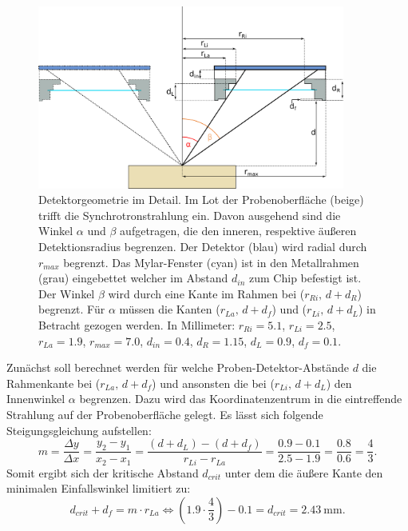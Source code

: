 \begin{figure}[H]
  \centering
     \includegraphics[width=0.9\textwidth]{illustrations/winkel.png}
  \caption[Detektorgeometrie im Detail]{Detektorgeometrie im Detail. Im Lot der Probenoberfläche (beige) trifft die Synchrotronstrahlung ein. Davon ausgehend sind die Winkel $\alpha$ und $\beta$ aufgetragen, die den inneren, respektive äußeren Detektionsradius begrenzen. Der Detektor (blau) wird radial durch $r_{max}$ begrenzt. Das Mylar-Fenster (cyan) ist in den Metallrahmen (grau) eingebettet welcher im Abstand $d_{in}$ zum Chip befestigt ist. Der Winkel $\beta$ wird durch eine Kante im Rahmen bei ($r_{Ri},\,d+d_{R}$) begrenzt. Für $\alpha$ müssen die Kanten ($r_{La},\,d+d_{f}$) und ($r_{Li},\,d+d_{L}$) in Betracht gezogen werden. In Millimeter: $r_{Ri}=5.1$, $r_{Li}=2.5$, $r_{La}=1.9$, $r_{max}=7.0$, $d_{in}=0.4$, $d_{R}=1.15$, $d_{L}=0.9$, $d_{f}=0.1$.}
  \label{fig:quaddetektor}
\end{figure}
Zunächst soll berechnet werden für welche Proben-Detektor-Abstände $d$ die Rahmenkante bei ($r_{La},\,d+d_{f}$) und ansonsten die bei ($r_{Li},\,d+d_{L}$) den Innenwinkel $\alpha$ begrenzen. Dazu wird das Koordinatenzentrum in die eintreffende Strahlung auf der Probenoberfläche gelegt. Es lässt sich folgende Steigungsgleichung aufstellen:
\begin{equation}
m = \frac{\Delta y}{\Delta x} = \frac{y_2-y_1}{x_2-x_1} = \frac{(d+d_{L})-(d+d_{f})}{r_{Li}-r_{La}} = \frac{0.9-0.1}{2.5-1.9} = \frac{0.8}{0.6} = \frac{4}{3} .
\end{equation}
Somit ergibt sich der kritische Abstand $d_{crit}$ unter dem die äußere Kante den minimalen Einfallswinkel limitiert zu:
\begin{equation}
d_{crit} + d_f = m \cdot r_{La} \Leftrightarrow (1.9 \cdot \frac{4}{3})-0.1 = d_{crit} = \SI{2.43}{\milli\meter} .
\end{equation}
